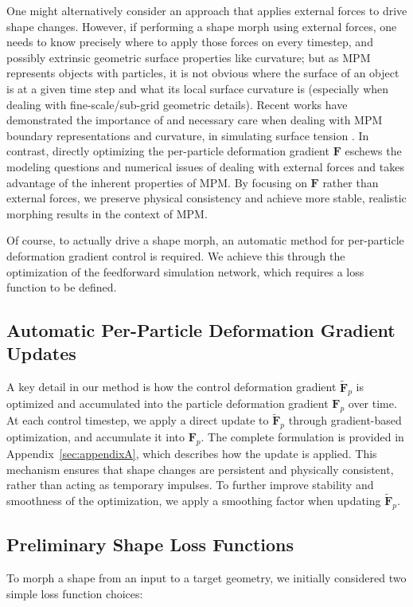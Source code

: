    One might alternatively consider an approach that applies external forces to drive shape changes.
    However, if performing a shape morph using external forces, one needs to know precisely where to apply those forces on every timestep, and possibly extrinsic geometric surface properties like curvature; but as MPM represents objects with particles, it is not obvious where the surface of an object is at a given time step and what its local surface curvature is (especially when dealing with fine-scale/sub-grid geometric details).  Recent works have demonstrated the importance of and necessary care when dealing with MPM boundary representations and curvature, in simulating surface tension \citep{implicit_mpm_surface_tension,conservative_surface_tension}.    
    In contrast, directly optimizing the per-particle deformation gradient $\mathbf{F}$ eschews the modeling questions and numerical issues of dealing with external forces and takes advantage of the inherent properties of MPM.
    By focusing on $\mathbf{F}$ rather than external forces, we preserve physical consistency and achieve more stable, realistic morphing results in the context of MPM.
    
    Of course, to actually drive a shape morph, an automatic method for per-particle deformation gradient control is required.
    We achieve this through the optimization of the feedforward simulation network, which requires a loss function to be defined.

\subsection{Automatic Per-Particle Deformation Gradient Updates}
    \label{sec:control-updates}
    
    A key detail in our method is how the control deformation gradient $\tilde{\mathbf{F}}_p$ is optimized and accumulated into the particle deformation gradient $\mathbf{F}_p$ over time. 
    At each control timestep, we apply a direct update to $\tilde{\mathbf{F}}_p$ through gradient-based optimization, and accumulate it into $\mathbf{F}_p$. 
    The complete formulation is provided in Appendix~\ref{sec:appendixA}, which describes how the update is applied.
    This mechanism ensures that shape changes are persistent and physically consistent, rather than acting as temporary impulses. 
    To further improve stability and smoothness of the optimization, we apply a smoothing factor when updating $\tilde{\mathbf{F}}_p$.

\subsection{Preliminary Shape Loss Functions}
    To morph a shape from an input to a target geometry, we initially considered two simple loss function choices:

